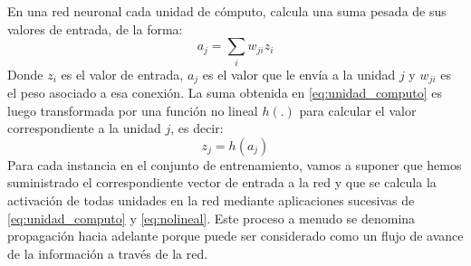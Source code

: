 \documentclass[a4paper,11pt,spanish]{book}
\begin{document}
	En una red neuronal cada unidad de cómputo, calcula una suma pesada de sus valores de entrada, de la forma:
	\begin{equation} \label{eq:unidad_computo}
	  a_j = \sum_{i} w_{ji} z_i
	\end{equation}
	Donde $z_i$ es el valor de entrada, $a_j$ es el valor que le envía a la unidad $j$ y $w_{ji}$ es el peso asociado a esa conexión.
	La suma obtenida en \eqref{eq:unidad_computo} es luego transformada por una función no lineal $h(.)$ para calcular el valor correspondiente a la unidad $j$, es decir:
	\begin{equation}\label{eq:nolineal}
	  z_j = h(a_j)
	\end{equation}
	Para cada instancia en el conjunto de entrenamiento, vamos a suponer que hemos suministrado el correspondiente vector de entrada a la red y que se calcula la
	activación de todas unidades en la red mediante aplicaciones sucesivas de \eqref{eq:unidad_computo} y \eqref{eq:nolineal}. 
	Este proceso a menudo se denomina propagación hacia adelante porque puede ser considerado como un flujo de avance de la información a través de la red.
	
\end{document}
